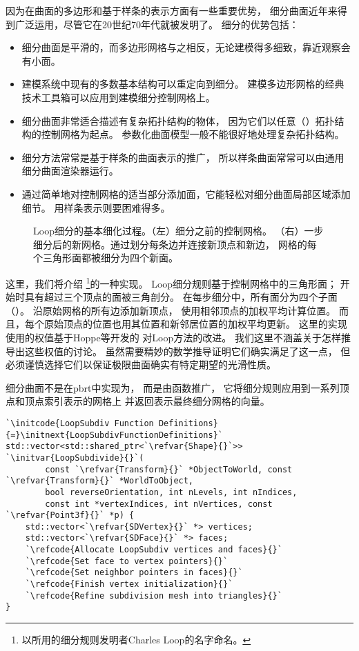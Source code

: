 因为在曲面的多边形和基于样条的表示方面有一些重要优势，
细分曲面近年来得到广泛运用，尽管它在20世纪70年代就被发明了。
细分的优势包括：
\begin{itemize}
    \item 细分曲面是平滑的，而多边形网格与之相反，无论建模得多细致，靠近观察会有小面。
    \item 建模系统中现有的多数基本结构可以重定向到细分。
          建模多边形网格的经典技术工具箱可以应用到建模细分控制网格上。
    \item 细分曲面非常适合描述有复杂拓扑结构的物体，
          因为它们以任意（）拓扑结构的控制网格为起点。
          参数化曲面模型一般不能很好地处理复杂拓扑结构。
    \item 细分方法常常是基于样条的曲面表示的推广，
          所以样条曲面常常可以由通用细分曲面渲染器运行。
    \item 通过简单地对控制网格的适当部分添加面，它能轻松对细分曲面局部区域添加细节。
          用样条表示则要困难得多。
\end{itemize}
\begin{figure}[htbp]
    \centering
    \caption{Loop细分的基本细化过程。（左）细分之前的控制网格。
        （右）一步细分后的新网格。通过划分每条边并连接新顶点和新边，
        网格的每个三角形面都被细分为四个新面。}
    \label{fig:3.26}
\end{figure}

这里，我们将介绍
\footnote{以所用的细分规则发明者Charles Loop的名字命名。}的一种实现。
Loop细分规则基于控制网格中的三角形面；
开始时具有超过三个顶点的面被三角剖分。
在每步细分中，所有面分为四个子面（）。
沿原始网格的所有边添加新顶点，
使用相邻顶点的加权平均计算位置。
而且，每个原始顶点的位置也用其位置和新邻居位置的加权平均更新。
这里的实现使用的权值基于Hoppe等\parencite*{10.1145/192161.192233}开发的
对Loop方法的改进。
我们这里不涵盖关于怎样推导出这些权值的讨论。
虽然需要精妙的数学推导证明它们确实满足了这一点，
但必须谨慎选择它们以保证极限曲面确实有特定期望的光滑性质。

细分曲面不是在pbrt中实现为，
而是由函数推广，
它将细分规则应用到一系列顶点和顶点索引表示的网格上
并返回表示最终细分网格的向量。
\begin{lstlisting}
`\initcode{LoopSubdiv Function Definitions}{=}\initnext{LoopSubdivFunctionDefinitions}`
std::vector<std::shared_ptr<`\refvar{Shape}{}`>> `\initvar{LoopSubdivide}{}`(
        const `\refvar{Transform}{}` *ObjectToWorld, const `\refvar{Transform}{}` *WorldToObject,
        bool reverseOrientation, int nLevels, int nIndices,
        const int *vertexIndices, int nVertices, const `\refvar{Point3f}{}` *p) {
    std::vector<`\refvar{SDVertex}{}` *> vertices;
    std::vector<`\refvar{SDFace}{}` *> faces;
    `\refcode{Allocate LoopSubdiv vertices and faces}{}`
    `\refcode{Set face to vertex pointers}{}`
    `\refcode{Set neighbor pointers in faces}{}`
    `\refcode{Finish vertex initialization}{}`
    `\refcode{Refine subdivision mesh into triangles}{}`
}
\end{lstlisting}

